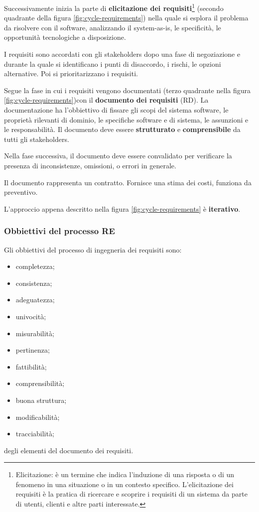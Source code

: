 Successivamente inizia la parte di \textbf{elicitazione dei requisiti}\footnote{Elicitazione: è un termine che indica l'induzione di una risposta o di un fenomeno in una situazione o in un contesto specifico. L'elicitazione dei requisiti è la pratica di ricercare e scoprire i requisiti di un sistema da parte di utenti, clienti e altre parti interessate.} (secondo quadrante della figura \ref{fig:cycle-requirements}) nella quale si esplora il problema da risolvere con il software, analizzando il system-as-is, le specificità, le opportunità tecnologiche a disposizione.

I requisiti sono accordati con gli stakeholders dopo una fase di negoziazione e durante la quale si identificano i punti di disaccordo, i rischi, le opzioni alternative. Poi si prioritarizzano i requisiti.

Segue la fase in cui i requisiti vengono documentati (terzo quadrante nella figura \ref{fig:cycle-requirements})con il \textbf{documento dei requisiti} (RD). La documentazione ha l'obbiettivo di fissare gli scopi del sistema software, le proprietà rilevanti di dominio, le specifiche software e di sistema, le assunzioni e le responsabilità. Il documento deve essere \textbf{strutturato} e \textbf{comprensibile} da tutti gli stakeholders.

Nella fase successiva, il documento deve essere convalidato per verificare la presenza di inconsistenze, omissioni, o errori in generale.

Il documento rappresenta un contratto. Fornisce una stima dei costi, funziona da preventivo.

L'approccio appena descritto nella figura \ref{fig:cycle-requirements} è \textbf{iterativo}.
\subsubsection{Obbiettivi del processo RE}
Gli obbiettivi del processo di ingegneria dei requisiti sono:
\begin{itemize}
	
	\item completezza;
	\item consistenza;
	\item adeguatezza;
	\item univocità;
	\item misurabilità;
	\item pertinenza;
	\item fattibilità;
	\item comprensibilità;
	\item buona struttura;
	\item modificabilità;
	\item tracciabilità;
\end{itemize}
degli elementi del documento dei requisiti.

